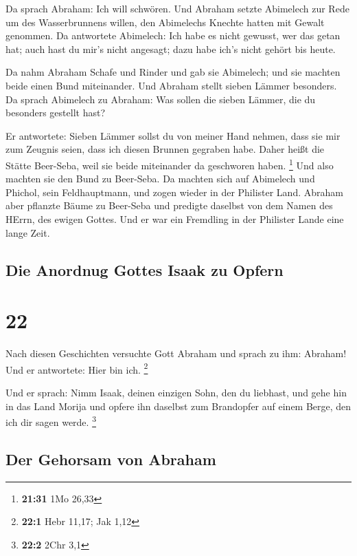  Da sprach Abraham: Ich will schwören. 
Und Abraham setzte Abimelech zur Rede um des Wasserbrunnens willen, den
Abimelechs Knechte hatten mit Gewalt genommen.  Da
antwortete Abimelech: Ich habe es nicht gewusst, wer das getan hat; auch
hast du mir's nicht angesagt; dazu habe ich's nicht gehört bis heute.

 Da nahm Abraham Schafe und Rinder und gab sie Abimelech;
und sie machten beide einen Bund miteinander.  Und
Abraham stellt sieben Lämmer besonders.  Da sprach
Abimelech zu Abraham: Was sollen die sieben Lämmer, die du besonders
gestellt hast?

 Er antwortete: Sieben Lämmer sollst du von meiner Hand
nehmen, dass sie mir zum Zeugnis seien, dass ich diesen Brunnen gegraben
habe.  Daher heißt die Stätte Beer-Seba, weil sie beide
miteinander da geschworen haben. \footnote{\textbf{21:31} 1Mo 26,33}
 Und also machten sie den Bund zu Beer-Seba. Da machten
sich auf Abimelech und Phichol, sein Feldhauptmann, und zogen wieder in
der Philister Land.  Abraham aber pflanzte Bäume zu
Beer-Seba und predigte daselbst von dem Namen des HErrn, des ewigen
Gottes.  Und er war ein Fremdling in der Philister Lande
eine lange Zeit.

\hypertarget{die-anordnug-gottes-isaak-zu-opfern}{%
\subsection{Die Anordnug Gottes Isaak zu
Opfern}\label{die-anordnug-gottes-isaak-zu-opfern}}

\hypertarget{section-21}{%
\section{22}\label{section-21}}

 Nach diesen Geschichten versuchte Gott Abraham und sprach
zu ihm: Abraham! Und er antwortete: Hier bin ich. \footnote{\textbf{22:1}
  Hebr 11,17; Jak 1,12}

 Und er sprach: Nimm Isaak, deinen einzigen Sohn, den du
liebhast, und gehe hin in das Land Morija und opfere ihn daselbst zum
Brandopfer auf einem Berge, den ich dir sagen werde. \footnote{\textbf{22:2}
  2Chr 3,1}

\hypertarget{der-gehorsam-von-abraham}{%
\subsection{Der Gehorsam von Abraham}\label{der-gehorsam-von-abraham}}

